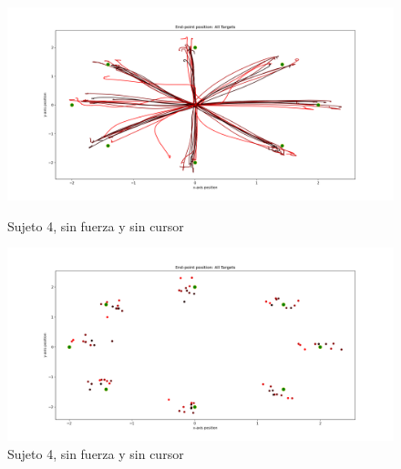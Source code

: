 \documentclass[a4paper,11pt, oneside]{book}
\begin{document}
\begin{figure}[H]
	\begin{minipage}[b]{0.5\linewidth}
		\centering
		\includegraphics[width=\linewidth]{sujeto4/no_force_no_cursor/trayectorias}
		\caption{Sujeto 4, sin fuerza y sin cursor}
		\label{fig:figura1}
	\end{minipage}
	\hspace{0.5cm}
	\begin{minipage}[b]{0.5\linewidth}
		\centering
		\includegraphics[width=\linewidth]{sujeto4/no_force_no_cursor/trayectorias_puntos}
		\caption{Sujeto 4, sin fuerza y sin cursor}
		\label{fig:figura2}
	\end{minipage}
\end{figure}
\end{document}

